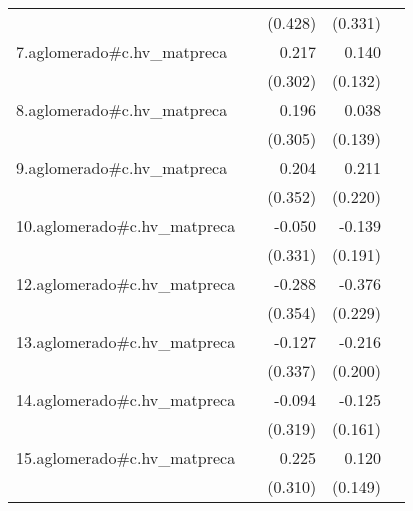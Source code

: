 {\begin{longtable}{l*{4}{D{.}{.}{-1}}}
            &                     &     (0.428)         &     (0.331)         &                     \\
\addlinespace
7.aglomerado#c.hv\_matpreca&                     &       0.217         &       0.140         &                     \\
            &                     &     (0.302)         &     (0.132)         &                     \\
\addlinespace
8.aglomerado#c.hv\_matpreca&                     &       0.196         &       0.038         &                     \\
            &                     &     (0.305)         &     (0.139)         &                     \\
\addlinespace
9.aglomerado#c.hv\_matpreca&                     &       0.204         &       0.211         &                     \\
            &                     &     (0.352)         &     (0.220)         &                     \\
\addlinespace
10.aglomerado#c.hv\_matpreca&                     &      -0.050         &      -0.139         &                     \\
            &                     &     (0.331)         &     (0.191)         &                     \\
\addlinespace
12.aglomerado#c.hv\_matpreca&                     &      -0.288         &      -0.376         &                     \\
            &                     &     (0.354)         &     (0.229)         &                     \\
\addlinespace
13.aglomerado#c.hv\_matpreca&                     &      -0.127         &      -0.216         &                     \\
            &                     &     (0.337)         &     (0.200)         &                     \\
\addlinespace
14.aglomerado#c.hv\_matpreca&                     &      -0.094         &      -0.125         &                     \\
            &                     &     (0.319)         &     (0.161)         &                     \\
\addlinespace
15.aglomerado#c.hv\_matpreca&                     &       0.225         &       0.120         &                     \\
            &                     &     (0.310)         &     (0.149)         &                     \\

\end{longtable}}
